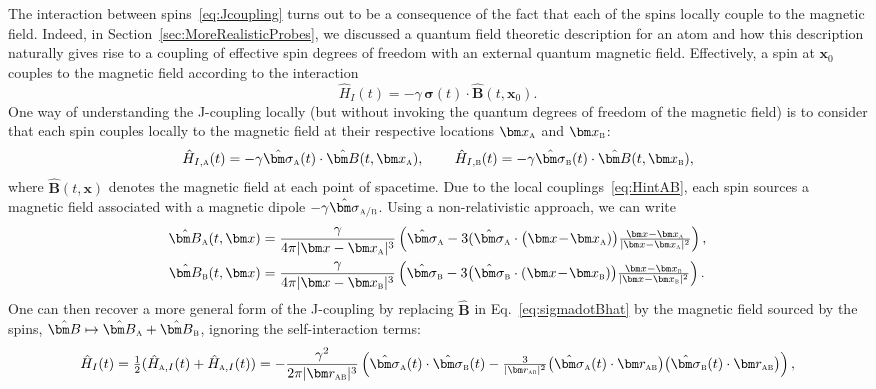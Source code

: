 \documentclass[letterpaper,12pt,titlepage,oneside,final]{book}
\newcommand{\tc}[1]{\textsc{#1}}
\begin{document}
    The interaction between spins~\eqref{eq:Jcoupling} turns out to be a consequence of the fact that each of the spins locally couple to the magnetic field. Indeed, in Section~\ref{sec:MoreRealisticProbes}, we discussed a quantum field theoretic description for an atom and how this description naturally gives rise to a coupling of effective spin degrees of freedom with an external quantum magnetic field. Effectively, a spin at $\bm x_0$ couples to the magnetic field according to the interaction
    \begin{equation}\label{eq:sigmadotBhat}
        \hat{H}_I(t) = - \gamma\, \hat{\bm \sigma}(t) \cdot \hat{\bm B}(t,\bm x_0). 
    \end{equation}
    One way of understanding the J-coupling locally (but without invoking the quantum degrees of freedom of the magnetic field) is to consider that each spin couples locally to the magnetic field at their respective locations $\bm x_\tc{a}$ and $\bm x_\tc{b}$:
    \begin{equation}\label{eq:HintAB}
        \hat{H}_{I,\tc{a}}(t) = - \gamma \hat{\bm \sigma}_\tc{a}(t)\cdot\hat{\bm B}(t,\bm x_\tc{a}),\, \quad \quad 
        \hat{H}_{I,\tc{b}}(t) = - \gamma \hat{\bm \sigma}_\tc{b}(t)\cdot\hat{\bm B}(t,\bm x_\tc{b}), 
    \end{equation}
    where $\hat{\bm B}(t,\bm x)$ denotes the magnetic field at each point of spacetime. Due to the local couplings~\eqref{eq:HintAB}, each spin sources a magnetic field associated with a magnetic dipole $-\gamma\hat{\bm \sigma}_\tc{a/b}$. Using a non-relativistic approach, we can write 
    \begin{align}
        \hat{\bm B}_\tc{a}(t,\bm x) &= \frac{\gamma}{4 \pi |\bm x - \bm x_\tc{a}|^3}\left(\hat{\bm \sigma}_\tc{a} - 3  (\hat{\bm\sigma}_\tc{a}\cdot\big(\bm x \!-\! \bm x_\tc{a})\big)\tfrac{\bm x - \bm x_\tc{a}}{|\bm x - \bm x_\tc{a}|^2}\right),\label{eq:BaBb}\\
        \hat{\bm B}_\tc{b}(t,\bm x) &= \frac{\gamma}{4 \pi |\bm x - \bm x_\tc{b}|^3}\left(\hat{\bm \sigma}_\tc{b} - 3  \big(\hat{\bm\sigma}_\tc{b}\cdot(\bm x \!-\! \bm x_\tc{b})\big)\tfrac{\bm x - \bm x_\tc{b}}{|\bm x - \bm x_\tc{b}|^2}\right).\nonumber
    \end{align}
    One can then recover a more general form of the J-coupling by replacing $\hat{\bm B}$ in Eq.~\eqref{eq:sigmadotBhat} by the magnetic field sourced by the spins, $\hat{\bm B}\mapsto \hat{\bm B}_\tc{a}+\hat{\bm B}_\tc{b}$, ignoring the self-interaction terms:
    \begin{equation}
        \hat{H}_I(t) = \tfrac{1}{2}(\hat{H}_{\tc{a},I}(t) + \hat{H}_{\tc{a},I}(t)) = - \frac{\gamma^2}{2\pi |\bm r_{\tc{ab}}|^3}\left(\hat{\bm \sigma}_\tc{a}(t)\cdot \hat{\bm \sigma}_\tc{b}(t) - \tfrac{3}{|\bm r_\tc{ab}|^2}  \big(\hat{\bm\sigma}_\tc{a}(t)\cdot\bm r_{\tc{ab}}\big)\big(\hat{\bm\sigma}_\tc{b}(t)\cdot\bm r_{\tc{ab}}\big)\right),
    \end{equation}
\end{document}

